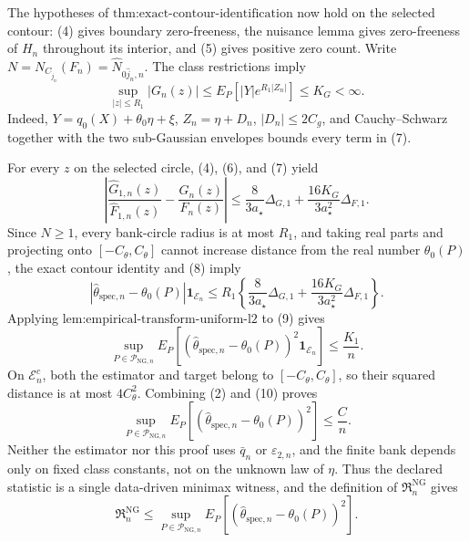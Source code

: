 The hypotheses of \(\text{thm:exact-contour-identification}\) now hold on
the selected contour: (4) gives boundary zero-freeness, the nuisance
lemma gives zero-freeness of \(H_n\) throughout its interior, and (5)
gives positive zero count.  Write
\(N=N_{C_{\widehat j_n}}(F_n)=\widehat N_{0\widehat j_n,n}\).
The class restrictions imply
\[
 \sup_{|z|\le R_1}|G_n(z)|
 \le E_P[|Y|e^{R_1|Z_n|}]
 \le K_G<\infty.                                        \tag{7}
\]
Indeed, \(Y=q_0(X)+\theta_0\eta+\xi\),
\(Z_n=\eta+D_n\), \(|D_n|\le2C_g\), and Cauchy--Schwarz together with
the two sub-Gaussian envelopes bounds every term in (7).

For every \(z\) on the selected circle, (4), (6), and (7) yield
\[
 \left|
  \frac{\widehat G_{1,n}(z)}{\widehat F_{1,n}(z)}
  -\frac{G_n(z)}{F_n(z)}
 \right|
 \le
 \frac{8}{3a_{\star}}\Delta_{G,1}
 +\frac{16K_G}{3a_{\star}^2}\Delta_{F,1}.              \tag{8}
\]
Since \(N\ge1\), every bank-circle radius is at most \(R_1\), and taking
real parts and projecting onto \([-C_{\theta},C_{\theta}]\) cannot
increase distance from the real number \(\theta_0(P)\), the exact contour
identity and (8) imply
\[
 |\widehat\theta_{\mathrm{spec},n}-\theta_0(P)|
 \mathbf 1_{\mathcal E_n}
 \le R_1\left\{
   \frac{8}{3a_{\star}}\Delta_{G,1}
   +\frac{16K_G}{3a_{\star}^2}\Delta_{F,1}
 \right\}.                                             \tag{9}
\]
Applying \(\text{lem:empirical-transform-uniform-l2}\) to (9) gives
\[
 \sup_{P\in\mathcal P_{\mathrm{NG},n}}
 E_P[(\widehat\theta_{\mathrm{spec},n}-\theta_0(P))^2
      \mathbf 1_{\mathcal E_n}]
 \le\frac{K_1}{n}.                                     \tag{10}
\]
On \(\mathcal E_n^c\), both the estimator and target belong to
\([-C_{\theta},C_{\theta}]\), so their squared distance is at most
\(4C_{\theta}^2\).  Combining (2) and (10) proves
\[
 \sup_{P\in\mathcal P_{\mathrm{NG},n}}
 E_P[(\widehat\theta_{\mathrm{spec},n}-\theta_0(P))^2]
 \le\frac Cn.                                          \tag{11}
\]
Neither the estimator nor this proof uses \(\bar q_n\) or
\(\varepsilon_{2,n}\), and the finite bank depends only on fixed class
constants, not on the unknown law of \(\eta\).  Thus the declared
statistic is a single data-driven minimax witness, and the definition of
\(\mathfrak R_n^{\mathrm{NG}}\) gives
\[
 \mathfrak R_n^{\mathrm{NG}}
 \le
 \sup_{P\in\mathcal P_{\mathrm{NG},n}}
 E_P[(\widehat\theta_{\mathrm{spec},n}-\theta_0(P))^2]. \tag{12}
\]

